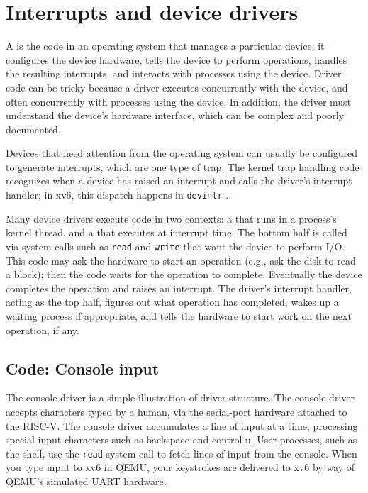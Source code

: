 \chapter{Interrupts and device drivers}
\label{CH:INTERRUPT}

A
is the code in an operating system that manages a particular device:
it configures the device hardware,
tells the device to perform operations,
handles the resulting interrupts,
and interacts with processes using the device.
Driver code can be tricky
because a driver executes concurrently with the device,
and often concurrently with processes using the device.  In
addition, the driver must understand the device's hardware interface,
which can be complex and poorly documented.

Devices that need attention from the operating system can usually be
configured to generate interrupts, which are one type of trap.
The kernel trap handling code recognizes when a device
has raised an interrupt and calls the driver's interrupt handler;
in xv6, this dispatch happens in {\tt devintr} .

Many device drivers execute code in two contexts: a  that runs in a process's kernel thread, and a  that executes at interrupt time. The bottom half
is called via system calls such as {\tt read} and {\tt write} that want
the device to perform I/O. This code may ask the hardware to start an
operation (e.g., ask the disk to read a block); then the code waits for
the operation to complete. Eventually the device completes the
operation and raises an interrupt. The driver's interrupt handler,
acting as the top half,
figures out what operation has completed, wakes up a waiting
process if appropriate, and tells the hardware to start work
on the next operation, if any.

\section{Code: Console input}

The console driver 
is a simple illustration of driver structure. The
console driver accepts characters typed by a human, via the 
serial-port hardware attached to the RISC-V. The console driver accumulates a
line of input at a time, processing special input characters such as
backspace and control-u. User processes, such as the shell, use
the {\tt read} system call to fetch lines of input from the console.
When you type input to xv6 in QEMU, your keystrokes are delivered to
xv6 by way of QEMU's simulated UART hardware.

